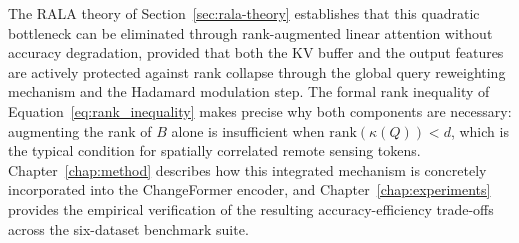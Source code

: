 The RALA theory of Section~\ref{sec:rala-theory} establishes that this
quadratic bottleneck can be eliminated through rank-augmented linear attention
without accuracy degradation, provided that both the KV buffer and the output
features are actively protected against rank collapse through the global query
reweighting mechanism and the Hadamard modulation step. The formal rank
inequality of Equation~\ref{eq:rank_inequality} makes precise why both
components are necessary: augmenting the rank of $B$ alone is insufficient
when $\mathrm{rank}(\kappa(Q)) < d$, which is the typical condition for
spatially correlated remote sensing tokens. Chapter~\ref{chap:method}
describes how this integrated mechanism is concretely incorporated into
the ChangeFormer encoder, and Chapter~\ref{chap:experiments} provides
the empirical verification of the resulting accuracy-efficiency trade-offs
across the six-dataset benchmark suite.
